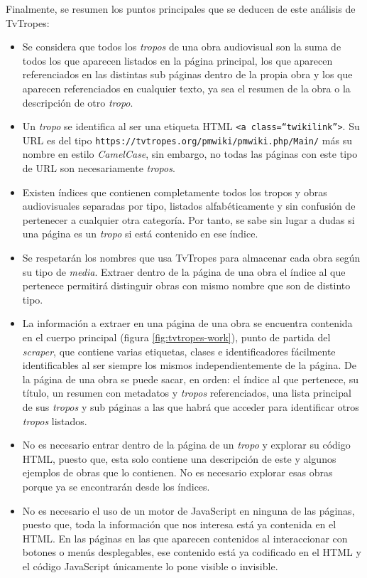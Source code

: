 Finalmente, se resumen los puntos principales que se deducen de este análisis de
TvTropes:
\begin{itemize}
    \item Se considera que todos los \textit{tropos} de una obra audiovisual son
    la suma de todos los que aparecen listados en la página principal, los que
    aparecen referenciados en las distintas sub páginas dentro de la propia obra
    y los que aparecen referenciados en cualquier texto, ya sea el resumen de la
    obra o la descripción de otro \textit{tropo}.
    \item Un \textit{tropo} se identifica al ser una etiqueta HTML \texttt{<a
    class=``twikilink''>}. Su URL es del tipo
    \texttt{https://tvtropes.org/pmwiki/pmwiki.php/Main/} más su nombre en estilo 
    \textit{CamelCase}, sin embargo, no todas las
    páginas con este tipo de URL son necesariamente \textit{tropos}.
    \item Existen índices que contienen completamente todos los tropos y obras
    audiovisuales separadas por tipo, listados alfabéticamente y sin confusión
    de pertenecer a cualquier otra categoría. Por tanto, se sabe sin lugar a
    dudas si una página es un \textit{tropo} si está contenido en ese índice.
    \item Se respetarán los nombres que usa TvTropes para almacenar cada obra
    según su tipo de \textit{media}. Extraer dentro de la página de una obra el
    índice al que pertenece permitirá distinguir obras con mismo nombre que son
    de distinto tipo.
    \item La información a extraer en una página de una obra se encuentra
    contenida en el cuerpo principal (figura \ref{fig:tvtropes-work}), punto de
    partida del \textit{scraper}, que contiene varias etiquetas, clases e
    identificadores fácilmente identificables al ser siempre los mismos
    independientemente de la página. De la página de una obra se puede sacar, en
    orden: el índice al que pertenece, su título, un resumen con metadatos y
    \textit{tropos} referenciados, una lista principal de sus \textit{tropos} y
    sub páginas a las que habrá que acceder para identificar otros
    \textit{tropos} listados.
    \item No es necesario entrar dentro de la página de un \textit{tropo} y
    explorar su código HTML, puesto que, esta solo contiene una descripción de
    este y algunos ejemplos de obras que lo contienen. No es necesario explorar
    esas obras porque ya se encontrarán desde los índices.
    \item No es necesario el uso de un motor de JavaScript en ninguna de las
    páginas, puesto que, toda la información que nos interesa está ya contenida
    en el HTML. En las páginas en las que aparecen contenidos al interaccionar
    con botones o menús desplegables, ese contenido está ya codificado en el
    HTML y el código JavaScript únicamente lo pone visible o invisible.
\end{itemize}


